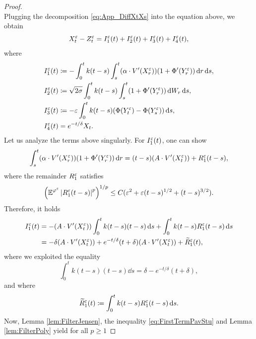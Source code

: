 \documentclass[10pt]{article}
\begin{document}
\begin{appendices}
\begin{proof}
\begin{equation}
	\end{equation}
	Plugging the decomposition \eqref{eq:App_DiffXtXs} into the equation above, we obtain
	\begin{equation}
	X_t^\varepsilon - Z_t^\varepsilon = I_1^\varepsilon(t) + I_2^\varepsilon(t) + I_3^\varepsilon(t) + I_4^\varepsilon(t),
	\end{equation}
	where
	\begin{equation}
	\begin{aligned}
	I_1^\varepsilon(t) &\coloneqq -\int_0^t k(t-s)\int_s^t (\alpha \cdot V'(X_r^\varepsilon))(1 + \Phi'(Y^\varepsilon_r)) \,\mathrm{d} r \,\mathrm{d} s,\\
	I_2^\varepsilon(t) &\coloneqq \sqrt{2\sigma}\int_0^t k(t-s) \int_s^t (1 + \Phi'(Y_r^\varepsilon)) \,\mathrm{d} W_r \,\mathrm{d} s, \\
	I_3^\varepsilon(t) &\coloneqq - \varepsilon \int_0^t k(t-s)(\Phi(Y^\varepsilon_t)-\Phi(Y^\varepsilon_s)) \,\mathrm{d} s,\\
	I_4^\varepsilon(t) &= e^{-t / \delta}X_t.
	\end{aligned}
	\end{equation}
	Let us analyze the terms above singularly. For $I_1^\varepsilon(t)$, one can show \cite[Proposition 5.8]{PaS07}
	\begin{equation}
	\int_s^t (\alpha \cdot V'(X_r^\varepsilon)) (1 + \Phi'(Y^\varepsilon_r)) \,\mathrm{d} r = (t - s)(A \cdot V'(X_t^\varepsilon)) + R_1^\varepsilon(t-s),
	\end{equation}
	where the remainder $R_1^\varepsilon$ satisfies 
	\begin{equation}\label{eq:FirstTermPavStu}
	\left(\operatorname{\mathbb{E}}^{\varphi^\varepsilon}\left\lvert R_1^\varepsilon(t-s)\right\rvert^p\right)^{1/p} \leq C(\varepsilon^2 + \varepsilon(t-s)^{1/2}+(t-s)^{3/2}).
	\end{equation}
	Therefore, it holds 
	\begin{equation}\label{eq:Diff_I1}
	\begin{aligned}
	I_1^\varepsilon(t) &= -(A \cdot V'(X_t^\varepsilon)) \int_0^t k(t-s) (t-s)\,\mathrm{d} s + \int_0^t k(t-s)R_1^\varepsilon(t-s) \,\mathrm{d} s\\
	&= -\delta (A \cdot  V'(X_t^\varepsilon)) + e^{-t/\delta}(t + \delta)(A \cdot V'(X_t^\varepsilon)) + \widetilde R_1^\varepsilon(t),
	\end{aligned}
	\end{equation}
	where we exploited the equality
	\begin{equation}
	\int_0^t k(t-s) (t-s) \dd s = \delta - e^{-t/\delta}(t + \delta),
	\end{equation}
	and where
	\begin{equation}
	\widetilde R_1^\varepsilon(t) \coloneqq \int_0^t k(t-s)R_1^\varepsilon(t-s) \,\mathrm{d} s.
	\end{equation}
	Now, Lemma \ref{lem:FilterJensen}, the inequality \eqref{eq:FirstTermPavStu} and Lemma \ref{lem:FilterPoly} yield for all $p \geq 1$

\end{proof}
\end{appendices}
\end{document}
